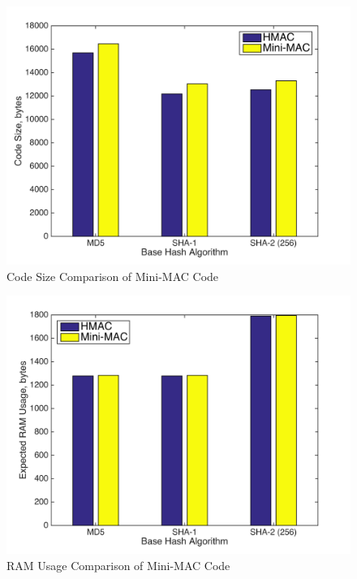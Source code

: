 	\begin{figure}
		\centering
		\includegraphics[width=\columnwidth]{figures/code_size.png}
		\caption{Code Size Comparison of Mini-MAC Code}
	\end{figure}
	
	\begin{figure}
		\centering
		\includegraphics[width=\columnwidth]{figures/ram_usage.png}
		\caption{RAM Usage Comparison of Mini-MAC Code}
	\end{figure}
	